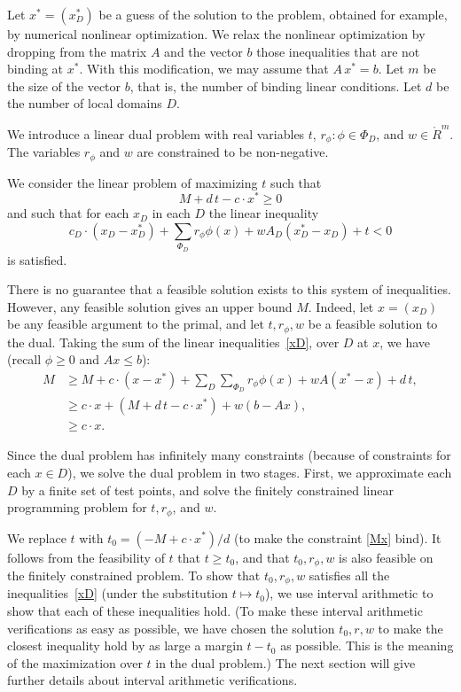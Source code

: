 Let $x^* = (x^*_D)$ be a guess of the solution to the problem,
obtained for example, by numerical nonlinear optimization. We
relax the nonlinear optimization by dropping from the matrix $A$
and the vector $b$ those inequalities that are not binding at
$x^*$. With this modification, we may assume that $A\,x^*=b$.  Let
$m$ be the size of the vector $b$, that is, the number of binding
linear conditions. Let $d$ be the number of local domains $D$.

We introduce a linear dual problem with real variables $t$,
$r_\phi: \phi\in\Phi_D$, and $w\in\ring{R}^m$. The variables
$r_\phi$ and $w$ are constrained to be non-negative.

We consider the linear problem of maximizing $t$ such that
    \begin{equation}
        M + d\, t - c\cdot x^* \ge 0
        \label{Mx}
    \end{equation}
and such that for each $x_D$ in each $D$ the linear inequality
    \begin{equation}
        c_D\cdot (x_D-x^*_D) + \sum_{\Phi_D} r_\phi \phi(x) +
                    w A_D (x^*_D-x_D) + t
            < 0
        \label{xD}
    \end{equation}
is satisfied.

There is no guarantee that a feasible solution exists to this
system of inequalities.  However, any feasible solution gives an
upper bound $M$. Indeed, let $x=(x_D)$ be any feasible argument to
the primal, and let $t,r_\phi,w$ be a feasible solution to the
dual. Taking the sum of the linear inequalities~\ref{xD}, over $D$
at $x$, we have (recall $\phi\ge0$ and $A x\le b$):
$$
\begin{array}{lll}
M &\ge M + c\cdot (x-x^*) + \sum_D\sum_{\Phi_D} r_\phi \phi(x)
    + w A (x^*-x) + d\, t,\\
    &\ge c\cdot x + (M + d\, t - c\cdot x^*) + w (b-A x),\\
    &\ge c\cdot x.
\end{array}
$$

Since the dual problem has infinitely many constraints (because of
constraints for each $x\in D$), we solve the dual problem in two
stages. First, we approximate each $D$ by a finite set of test
points, and solve the finitely constrained linear programming
problem for $t, r_\phi$, and $w$.

We replace $t$ with $t_0 = (-M +c\cdot x^*)/d$ (to make the
constraint \ref{Mx} bind).  It follows from the feasibility of $t$
that $t\ge t_0$, and that $t_0,r_\phi,w$ is also feasible on the
finitely constrained problem. To show that $t_0,r_\phi,w$
satisfies all the inequalities~\ref{xD} (under the substitution
$t\mapsto t_0$), we use interval arithmetic to show that each of
these inequalities hold. (To make these interval arithmetic
verifications as easy as possible, we have chosen the solution
$t_0,r,w$ to make the closest inequality hold by as large a margin
$t-t_0$ as possible. This is the meaning of the maximization over
$t$ in the dual problem.)  The next section will give further
details about interval arithmetic verifications.

